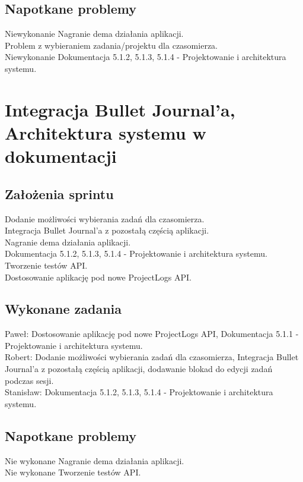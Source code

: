 \documentclass[a4paper,11pt]{report}
\begin{document}
\subsection {Napotkane problemy}
Niewykonanie Nagranie dema działania aplikacji.\\
Problem z wybieraniem zadania/projektu dla czasomierza.\\ 
Niewykonanie Dokumentacja 5.1.2, 5.1.3, 5.1.4 - Projektowanie i architektura systemu.\\


\section {Integracja Bullet Journal’a, Architektura systemu w dokumentacji}
\subsection {Założenia sprintu}
Dodanie możliwości wybierania zadań dla czasomierza.\\
Integracja Bullet Journal’a z pozostałą częścią aplikacji.\\
Nagranie dema działania aplikacji.\\
Dokumentacja 5.1.2, 5.1.3, 5.1.4 - Projektowanie i architektura systemu.\\
Tworzenie testów API.\\
Dostosowanie aplikację pod nowe ProjectLogs API.\\
\subsection {Wykonane zadania}
Paweł: Dostosowanie aplikację pod nowe ProjectLogs API, Dokumentacja 5.1.1 - Projektowanie i architektura systemu.\\
Robert: Dodanie możliwości wybierania zadań dla czasomierza, Integracja Bullet Journal’a z pozostałą częścią aplikacji, dodawanie blokad do edycji zadań podczas sesji. \\
Stanisław: Dokumentacja 5.1.2, 5.1.3, 5.1.4 - Projektowanie i architektura systemu.\\
\subsection {Napotkane problemy}
Nie wykonane Nagranie dema działania aplikacji.\\
Nie wykonane Tworzenie testów API.\\
\end{document}
